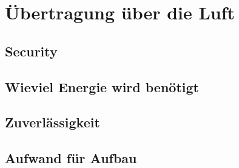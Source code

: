 \chapter{Übertragung über die Luft}
\section{Security}
\section{Wieviel Energie wird benötigt}
\section{Zuverlässigkeit}
\section{Aufwand für Aufbau}
